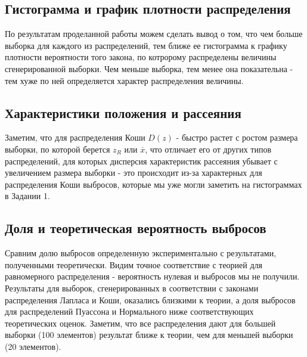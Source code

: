 \documentclass[../body.tex]{subfiles}
\begin{document}
	\subsection{Гистограмма и график плотности распределения}
	По результатам проделанной работы можем сделать вывод о том, что чем больше выборка для каждого из распределений, тем ближе ее гистограмма к графику плотности вероятности того закона, по котророму распределены величины сгенерированной выборки. Чем меньше выборка, тем менее она показательна - тем хуже по ней определяется характер распределения величины.
	\subsection{Характеристики положения и рассеяния}
	Заметим, что для распределения Коши $D(z)$ - быстро растет с ростом размера выборки, по которой берется $z_R$ или $\overline{x}$, что отличает его от других типов распределений, для которых дисперсия характеристик рассеяния убывает с увеличением размера выборки - это происходит из-за характерных для распределения Коши выбросов, которые мы уже могли заметить на гистограммах в Задании 1.
	\subsection{Доля и теоретическая вероятность выбросов}
	Сравним долю выбросов определенную экспериментально с результатами, полученными теоретически. Видим точное соответствие с теорией для равномерного распределения - вероятность нулевая и выбросов мы не получили.\newline
	Результаты для выборок, сгенерированных в соответствии с законами распределения Лапласа и Коши, оказались близкими к теории, а доля выбросов для распределений Пуассона и Нормального ниже соответствующих теоретических оценок.\newline
	Заметим, что все распределения дают для большей выборки (100 элементов) результат ближе к теории, чем для меньшей выборки (20 элементов).
\end{document}
